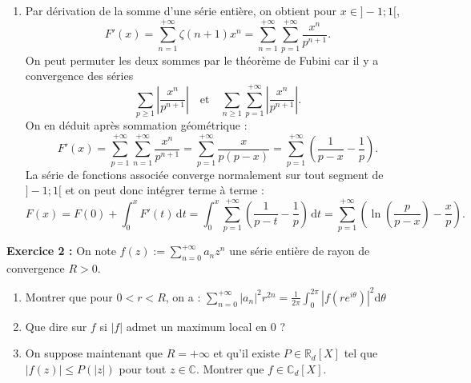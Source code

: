 \documentclass[11pt,a4paper]{article}
\begin{document}
\begin{enumerate}
\item Par dérivation de la somme d'une série entière, on obtient pour $x \in ]-1;1[$,
\[
F'(x) = \sum_{n=1}^{+\infty} \zeta(n+1) x^n = \sum_{n=1}^{+\infty} \sum_{p=1}^{+\infty} \frac{x^n}{p^{n+1}}.
\]
On peut permuter les deux sommes par le théorème de Fubini car il y a convergence des séries
\[
\sum_{p \ge 1} \left|\frac{x^n}{p^{n+1}}\right| \quad \text{et} \quad \sum_{n \ge 1} \sum_{p=1}^{+\infty} \left|\frac{x^n}{p^{n+1}}\right|.
\]
On en déduit après sommation géométrique :
\[
F'(x) = \sum_{p=1}^{+\infty} \sum_{n=1}^{+\infty} \frac{x^n}{p^{n+1}} = \sum_{p=1}^{+\infty} \frac{x}{p(p-x)} = \sum_{p=1}^{+\infty} \left(\frac{1}{p-x} - \frac{1}{p}\right).
\]
La série de fonctions associée converge normalement sur tout segment de $]-1;1[$ et on peut donc intégrer terme à terme :
\[
F(x) = F(0) + \int_0^x F'(t) \, \mathrm{d}t = \int_0^x \sum_{p=1}^{+\infty} \left(\frac{1}{p-t} - \frac{1}{p}\right) \, \mathrm{d}t = \sum_{p=1}^{+\infty} \left(\ln\left(\frac{p}{p-x}\right) - \frac{x}{p}\right).
\]

\end{enumerate}

\textbf{Exercice 2 :} On note $f(z) := \displaystyle \sum_{n=0}^{+\infty} a_n z^n$ une série entière de rayon de convergence $R >0$.

\begin{enumerate}
\item Montrer que pour $0<r<R$, on a : $\displaystyle \sum_{n=0}^{+\infty}|a_n|^2r^{2n}=\frac{1}{2\pi}\int_0^{2\pi} |f(re^{i\theta})|^2\mathrm{d}\theta $
\item Que dire sur $f$ si $|f|$ admet un maximum local en 0 ?
\item On suppose maintenant que $R=+\infty$ et qu'il existe $P \in \mathbb{R}_d[X]$ tel que $|f(z)|\leq P(|z|)$ pour tout $z \in \mathbb{C}$. Montrer que $f\in \mathbb{C}_d[X]$.
\end{enumerate}
\end{document}
